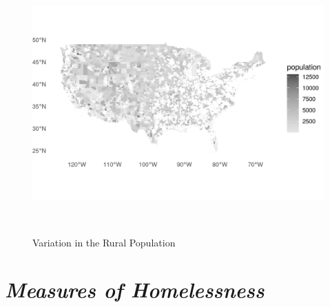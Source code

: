  

\begin{figure}[htbp] 

\centering 

\includegraphics[width=1\textwidth, height=10cm]{plots/pop_map.png} 

\caption{Variation in the Rural Population} 

\label{fig:pop_map} 

\end{figure} 

 

 

\section{\textit{Measures of Homelessness}} 

 

